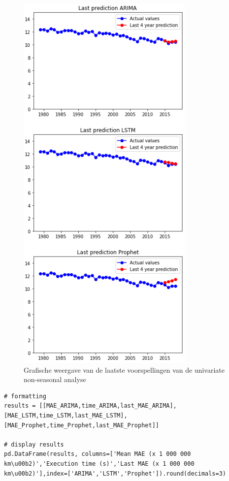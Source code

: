 \begin{figure}[!h]
    \centering
    \caption{Grafische weergave van de laatste voorspellingen van de univariate non-seasonal analyse}
    \label{fig:uvnsresultgraph}
    \includegraphics[width=0.7\linewidth]{uv_ns_result_graph}
\end{figure}



\begin{verbatim}
# formatting
results = [[MAE_ARIMA,time_ARIMA,last_MAE_ARIMA],[MAE_LSTM,time_LSTM,last_MAE_LSTM],[MAE_Prophet,time_Prophet,last_MAE_Prophet]]

# display results
pd.DataFrame(results, columns=['Mean MAE (x 1 000 000 km\u00b2)','Execution time (s)','Last MAE (x 1 000 000 km\u00b2)'],index=['ARIMA','LSTM','Prophet']).round(decimals=3)

\end{verbatim}

